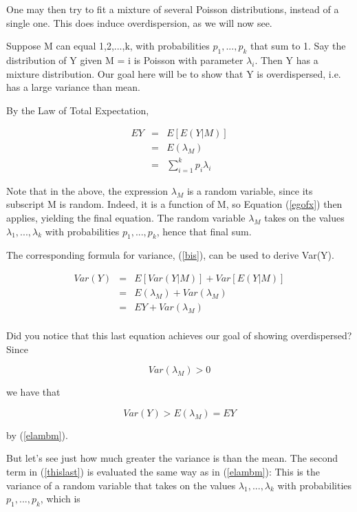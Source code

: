 One may then try to fit a mixture of several Poisson distributions,
instead of a single one.  This does induce overdispersion, as we will
now see.  

Suppose M can equal 1,2,...,k, with probabilities $p_1,...,p_k$ that sum
to 1.  Say the distribution of Y given M = i is Poisson with parameter
$\lambda_i$.  Then Y has a mixture distribution.  Our goal here will be
to show that Y is overdispersed, i.e. has a large variance than mean.

By the Law of Total Expectation,

\begin{eqnarray}
\label{meanlamb}
EY &=& E[E(Y|M)] \\ 
&=& E(\lambda_M) \label{elambm} \\
&=& \sum_{i=1}^k p_i \lambda_i
\end{eqnarray}

Note that in the above, the expression $\lambda_M$ is a random variable,
since its subscript M is random.  Indeed, it is a function of M, so
Equation (\ref{egofx}) then applies, yielding the final equation.  The
random variable $\lambda_M$ takes on the values $\lambda_1,...,\lambda_k$
with probabilities $p_1,...,p_k$, hence that final sum.

The corresponding formula for variance, (\ref{bis}), can be used to
derive Var(Y).

\begin{eqnarray}
Var(Y) &=& E[Var(Y|M)] + Var[E(Y|M)] \\ 
&=& E(\lambda_M) + Var(\lambda_M) \label{thislast} \\
&=& EY + Var(\lambda_M) \label{thislast} \\
\end{eqnarray}

Did you notice that this last equation achieves our goal of showing
overdispersed?  Since

\begin{equation}
Var(\lambda_M) > 0
\end{equation}

we have that

\begin{equation}
Var(Y) > E(\lambda_M) = EY
\end{equation}

by (\ref{elambm}).

But let's see just how much greater the variance is than the mean.  The
second term in (\ref{thislast}) is evaluated the same way as in
(\ref{elambm}):  This is the variance of a random variable that takes on
the values $\lambda_1,...,\lambda_k$ with probabilities $p_1,...,p_k$,
which is

